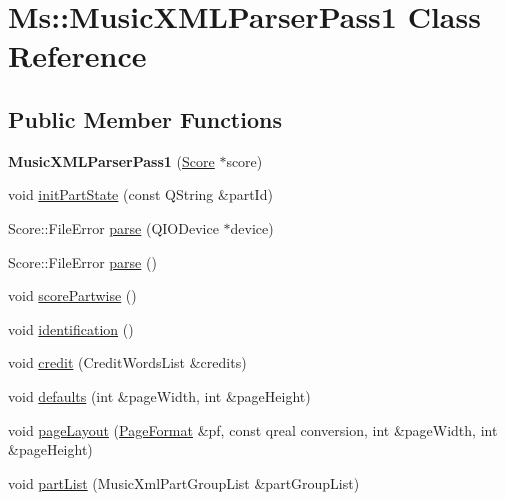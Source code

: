 \hypertarget{class_ms_1_1_music_x_m_l_parser_pass1}{}\section{Ms\+:\+:Music\+X\+M\+L\+Parser\+Pass1 Class Reference}
\label{class_ms_1_1_music_x_m_l_parser_pass1}
\subsection*{Public Member Functions}
\begin{DoxyCompactItemize}
\item 
\mbox{\label{class_ms_1_1_music_x_m_l_parser_pass1_ac3c07acad6c6c7bd70562c4a78126288}} 
{\bfseries Music\+X\+M\+L\+Parser\+Pass1} (\hyperlink{class_ms_1_1_score}{Score} $\ast$score)
\item 
void \hyperlink{class_ms_1_1_music_x_m_l_parser_pass1_a8cad35ac46557855c87e3e497f323d14}{init\+Part\+State} (const Q\+String \&part\+Id)
\item 
Score\+::\+File\+Error \hyperlink{class_ms_1_1_music_x_m_l_parser_pass1_abed4dea5b7f1b7f2d44a782e7f2abfe5}{parse} (Q\+I\+O\+Device $\ast$device)
\item 
Score\+::\+File\+Error \hyperlink{class_ms_1_1_music_x_m_l_parser_pass1_aff543e2b13503dc8646f50f269372211}{parse} ()
\item 
void \hyperlink{class_ms_1_1_music_x_m_l_parser_pass1_a4bb6592ded44648255e7181efc672cfb}{score\+Partwise} ()
\item 
void \hyperlink{class_ms_1_1_music_x_m_l_parser_pass1_a94600ed5a1a21049dc28fb143a398ffd}{identification} ()
\item 
void \hyperlink{class_ms_1_1_music_x_m_l_parser_pass1_a20ea5b9e1776760bdbba0d5ccc2777fa}{credit} (Credit\+Words\+List \&credits)
\item 
void \hyperlink{class_ms_1_1_music_x_m_l_parser_pass1_ad429594859ba9b9c6e26c534227944f5}{defaults} (int \&page\+Width, int \&page\+Height)
\item 
void \hyperlink{class_ms_1_1_music_x_m_l_parser_pass1_ace07d590acdb0a0f933225af36b775a2}{page\+Layout} (\hyperlink{class_ms_1_1_page_format}{Page\+Format} \&pf, const qreal conversion, int \&page\+Width, int \&page\+Height)
\item 
void \hyperlink{class_ms_1_1_music_x_m_l_parser_pass1_a1abbf626a79e74b39c84b530765f6a5f}{part\+List} (Music\+Xml\+Part\+Group\+List \&part\+Group\+List)

\end{DoxyCompactItemize}
